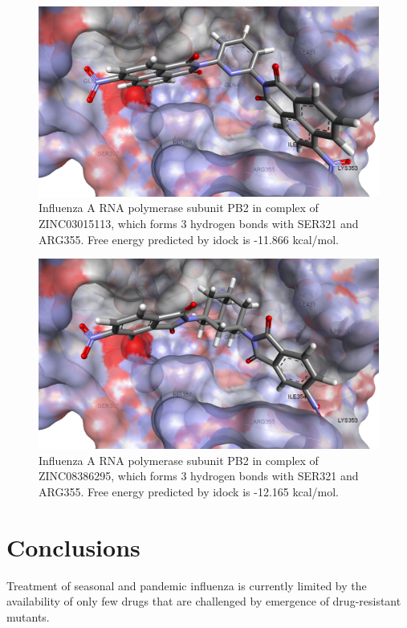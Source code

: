 \begin{figure}
\centering
\includegraphics[width=\linewidth]{../influenza/2VQZ-ZINC03015113.png}
\caption{Influenza A RNA polymerase subunit PB2 in complex of ZINC03015113, which forms 3 hydrogen bonds with SER321 and ARG355. Free energy predicted by idock is -11.866 kcal/mol.}
\label{influenza:2VQZ-ZINC03015113}
\end{figure}

\begin{figure}
\centering
\includegraphics[width=\linewidth]{../influenza/2VQZ-ZINC08386295.png}
\caption{Influenza A RNA polymerase subunit PB2 in complex of ZINC08386295, which forms 3 hydrogen bonds with SER321 and ARG355. Free energy predicted by idock is -12.165 kcal/mol.}
\label{influenza:2VQZ-ZINC08386295}
\end{figure}

\section{Conclusions}

Treatment of seasonal and pandemic influenza is currently limited by the availability of only few drugs that are challenged by emergence of drug-resistant mutants.

